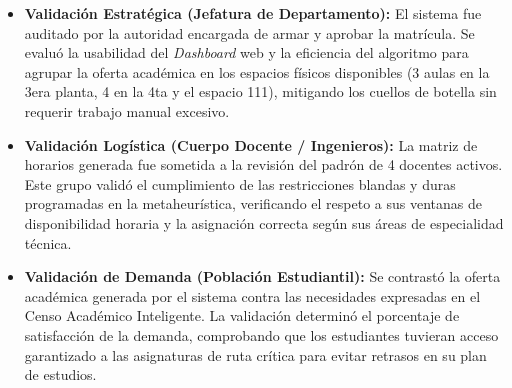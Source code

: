 \begin{itemize}
    \item \textbf{Validación Estratégica (Jefatura de Departamento):} El sistema fue auditado por la autoridad encargada de armar y aprobar la matrícula. Se evaluó la usabilidad del \textit{Dashboard} web y la eficiencia del algoritmo para agrupar la oferta académica en los espacios físicos disponibles (3 aulas en la 3era planta, 4 en la 4ta y el espacio 111), mitigando los cuellos de botella sin requerir trabajo manual excesivo.
    \item \textbf{Validación Logística (Cuerpo Docente / Ingenieros):} La matriz de horarios generada fue sometida a la revisión del padrón de 4 docentes activos. Este grupo validó el cumplimiento de las restricciones blandas y duras programadas en la metaheurística, verificando el respeto a sus ventanas de disponibilidad horaria y la asignación correcta según sus áreas de especialidad técnica.
    \item \textbf{Validación de Demanda (Población Estudiantil):} Se contrastó la oferta académica generada por el sistema contra las necesidades expresadas en el Censo Académico Inteligente. La validación determinó el porcentaje de satisfacción de la demanda, comprobando que los estudiantes tuvieran acceso garantizado a las asignaturas de ruta crítica para evitar retrasos en su plan de estudios.
\end{itemize}